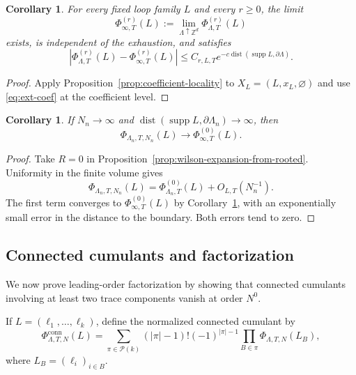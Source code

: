 \documentclass[11pt,a4paper,reqno]{amsart}
\newtheorem{corollary}[theorem]{Corollary}
\theoremstyle{definition}
\theoremstyle{remark}
\newcommand\Z{{\mathbb{Z}}}
\newcommand\conn{{\mathrm{conn}}}
\begin{document}
\begin{corollary}\label{cor:infinite-volume-coefficients}
For every fixed loop family $L$ and every $r\ge0$, the limit
\[
\Phi^{(r)}_{\infty,T}(L):=\lim_{\Lambda\uparrow\Z^d}\Phi^{(r)}_{\Lambda,T}(L)
\]
exists, is independent of the exhaustion, and satisfies
\[
\left|\Phi^{(r)}_{\Lambda,T}(L)-\Phi^{(r)}_{\infty,T}(L)\right|
\le C_{r,L,T}e^{-c\operatorname{dist}(\operatorname{supp}L,\partial\Lambda)}.
\]
\end{corollary}

\begin{proof}
Apply Proposition~\ref{prop:coefficient-locality} to $X_L=(L,x_L,\varnothing)$ and use \eqref{eq:ext-coef} at the coefficient level.
\end{proof}

\begin{corollary}\label{cor:joint-largeN-volume-limit}
If $N_n\to\infty$ and $\operatorname{dist}(\operatorname{supp}L,\partial\Lambda_n)\to\infty$, then
\[
\Phi_{\Lambda_n,T,N_n}(L)\longrightarrow\Phi^{(0)}_{\infty,T}(L).
\]
\end{corollary}

\begin{proof}
Take $R=0$ in Proposition~\ref{prop:wilson-expansion-from-rooted}. Uniformity in the finite volume gives
\[
\Phi_{\Lambda_n,T,N_n}(L)=\Phi^{(0)}_{\Lambda_n,T}(L)+O_{L,T}(N_n^{-1}).
\]
The first term converges to $\Phi^{(0)}_{\infty,T}(L)$ by Corollary~\ref{cor:infinite-volume-coefficients}, with an exponentially small error in the distance to the boundary. Both errors tend to zero.
\end{proof}

\subsection{Connected cumulants and factorization}\label{subsec:connected-cumulants-factorization}

We now prove leading-order factorization by showing that connected cumulants involving at least two trace components vanish at order $N^0$.

If $L=(\ell_1,\ldots,\ell_k)$, define the normalized connected cumulant by
\begin{equation}\label{eq:norm-conn-cumulant}
\Phi^{\conn}_{\Lambda,T,N}(L)
=
\sum_{\pi\in\mathcal P(k)}(|\pi|-1)!(-1)^{|\pi|-1}
\prod_{B\in\pi}\Phi_{\Lambda,T,N}(L_B),
\end{equation}
where $L_B=(\ell_i)_{i\in B}$.
\end{document}
